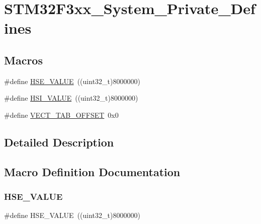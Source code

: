 \hypertarget{group___s_t_m32_f3xx___system___private___defines}{}\section{S\+T\+M32\+F3xx\+\_\+\+System\+\_\+\+Private\+\_\+\+Defines}
\label{group___s_t_m32_f3xx___system___private___defines}
\subsection*{Macros}
\begin{DoxyCompactItemize}
\item 
\#define \mbox{\hyperlink{group___s_t_m32_f3xx___system___private___defines_gaeafcff4f57440c60e64812dddd13e7cb}{H\+S\+E\+\_\+\+V\+A\+L\+UE}}~((uint32\+\_\+t)8000000)
\item 
\#define \mbox{\hyperlink{group___s_t_m32_f3xx___system___private___defines_gaaa8c76e274d0f6dd2cefb5d0b17fbc37}{H\+S\+I\+\_\+\+V\+A\+L\+UE}}~((uint32\+\_\+t)8000000)
\item 
\#define \mbox{\hyperlink{group___s_t_m32_f3xx___system___private___defines_ga40e1495541cbb4acbe3f1819bd87a9fe}{V\+E\+C\+T\+\_\+\+T\+A\+B\+\_\+\+O\+F\+F\+S\+ET}}~0x0
\end{DoxyCompactItemize}


\subsection{Detailed Description}


\subsection{Macro Definition Documentation}
\mbox{\label{group___s_t_m32_f3xx___system___private___defines_gaeafcff4f57440c60e64812dddd13e7cb}} 
\subsubsection{\texorpdfstring{H\+S\+E\+\_\+\+V\+A\+L\+UE}{HSE\_VALUE}}
{\footnotesize\ttfamily \#define H\+S\+E\+\_\+\+V\+A\+L\+UE~((uint32\+\_\+t)8000000)}

